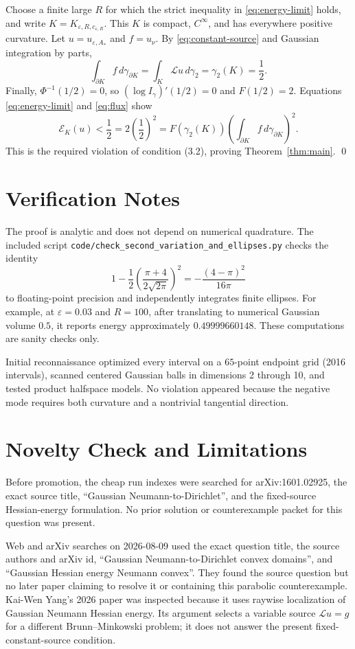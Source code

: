 \documentclass[11pt]{article}
\newcommand{\eps}{\varepsilon}
\newcommand{\cL}{\mathcal L}
\begin{document}
Choose a finite large $R$ for which the strict inequality in
\eqref{eq:energy-limit} holds, and write $K=K_{\eps,R,c_{\eps,R}}$.  This $K$
is compact, $C^\infty$, and has everywhere positive curvature.  Let
$u=u_{\eps,A_*}$ and $f=u_\nu$.  By \eqref{eq:constant-source} and Gaussian
integration by parts,
\begin{equation}\label{eq:flux}
 \int_{\partial K}f\,d\gamma_{\partial K}
 =\int_K\cL u\,d\gamma_2=\gamma_2(K)=\frac12.
\end{equation}
Finally, $\Phi^{-1}(1/2)=0$, so $(\log I_\gamma)'(1/2)=0$ and
$F(1/2)=2$.  Equations \eqref{eq:energy-limit} and \eqref{eq:flux} show
\[
 \mathcal E_K(u)<\frac12
 =2\left(\frac12\right)^2
 =F(\gamma_2(K))
   \left(\int_{\partial K}f\,d\gamma_{\partial K}\right)^2.
\]
This is the required violation of condition (3.2), proving
Theorem~\ref{thm:main}. \qed

\section*{Verification Notes}

The proof is analytic and does not depend on numerical quadrature.  The
included script
\texttt{code/check\_second\_variation\_and\_ellipses.py} checks the identity
\[
 1-\frac{1}{2}\left(\frac{\pi+4}{2\sqrt{2\pi}}\right)^2
 =-\frac{(4-\pi)^2}{16\pi}
\]
to floating-point precision and independently integrates finite ellipses.
For example, at $\eps=0.03$ and $R=100$, after translating to numerical
Gaussian volume $0.5$, it reports energy approximately
$0.49999660148$.  These computations are sanity checks only.

Initial reconnaissance optimized every interval on a $65$-point endpoint
grid (2016 intervals), scanned centered Gaussian balls in dimensions 2 through
10, and tested product halfspace models.  No violation appeared because the
negative mode requires both curvature and a nontrivial tangential direction.

\section*{Novelty Check and Limitations}

Before promotion, the cheap run indexes were searched for arXiv:1601.02925,
the exact source title, ``Gaussian Neumann-to-Dirichlet'', and the fixed-source
Hessian-energy formulation.  No prior solution or counterexample packet for
this question was present.

Web and arXiv searches on 2026-08-09 used the exact question title, the source
authors and arXiv id, ``Gaussian Neumann-to-Dirichlet convex domains'', and
``Gaussian Hessian energy Neumann convex''.  They found the source question
but no later paper claiming to resolve it or containing this parabolic
counterexample.  Kai-Wen Yang's 2026 paper \cite{Yang} was inspected because
it uses raywise localization of Gaussian Neumann Hessian energy.  Its argument
selects a variable source $\cL u=g$ for a different Brunn--Minkowski problem;
it does not answer the present fixed-constant-source condition.
\end{document}
